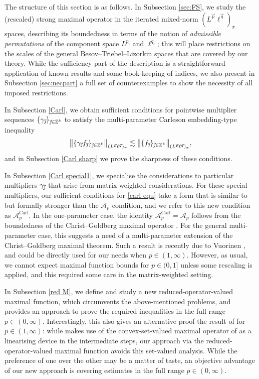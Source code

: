 \documentclass[11pt, reqno]{amsart}
\theoremstyle{definition}
\theoremstyle{remark}
\numberwithin{equation}{section}
\newcommand{\A}{\mathscr A}
\newcommand{\Z}{\mathbb Z}
\newcommand{\vj}{\vec{\textit{\j}}}
\newcommand{\vp}{\vec p}
\newcommand{\vq}{\vec q}
\newcommand{\bNorm}[2]{\big\|#1\big\|_{#2}}
\newcommand{\Carl}{\mathrm{Carl}}
\begin{document}
The structure of this section is as follows.
In Subsection \ref{sec:FS}, we study the (rescaled) strong maximal operator in the iterated mixed-norm $(L^{\vp}\ell^{\vq})_\pi$ spaces, describing its boundedness in terms of the notion of {\em admissible permutations} of the component space $L^{p_i}$ and $\ell^{q_i}$; this will place restrictions on the scales of the general Besov--Triebel--Lizorkin spaces that are covered by our theory. While the sufficiency part of the description is a straightforward application of known results and some book-keeping of indices, we also present in Subsection \ref{sec:necpart} a full set of counterexamples to show the necessity of all imposed restrictions.

In Subsection \ref{Carl}, we obtain sufficient conditions for pointwise multiplier sequences $\{\gamma_{\vj}\}_{\vj\in\Z^k}$ to satisfy the multi-parameter Carleson embedding-type inequality
\begin{equation} \label{carl equ}
\bNorm{\{\gamma_{\vj}f_{\vj}\}_{\vj\in\mathbb Z^k}}{(L^{\vp}\ell^{\vq})_\pi}
\lesssim \bNorm{\{ f_{\vj}\}_{\vj\in\mathbb Z^k}}{(L^{\vp}\ell^{\vq})_\pi},
\end{equation}
and in Subsection \ref{Carl sharp} we prove the sharpness of these conditions.

In Subsection \ref{Carl special1}, we specialise the considerations to particular multipliers $\gamma_{\vj}$ that arise from matrix-weighted considerations. For these special multipliers, our sufficient conditions for \eqref{carl equ} take a form that is similar to but formally stronger than the $\A_p$ condition, and we refer to this new condition as $\A_p^{\Carl}$. In the one-parameter case, the identity $\A_p^{\Carl}=\A_p$ follows from the boundedness of the Christ--Goldberg maximal operator \cite{CG01,Gold03}. For the general multi-parameter case, this suggests a need of a multi-parameter extension of the Christ--Goldberg maximal theorem. Such a result is recently due to Vuorinen \cite{Vuo24}, and could be directly used for our needs when $p\in(1,\infty)$. However, as usual, we cannot expect maximal function bounds for $p\in(0,1]$ unless some rescaling is applied, and this required some care in the matrix-weighted setting.

In Subsection \ref{red M}, we define and study a new reduced-operator-valued maximal function, which circumvents the above-mentioned problems, and provides an approach to prove the required inequalities in the full range $p\in(0,\infty)$. Interestingly, this also gives an alternative proof the result of \cite{Vuo24} for $p\in(1,\infty)$: while \cite{Vuo24} makes use of the convex-set-valued maximal operator of \cite{BCU} as a linearising device in the intermediate steps, our approach via the reduced-operator-valued maximal function avoids this set-valued analysis. While the preference of one over the other may be a matter of taste, an objective advantage of our new approach is covering estimates in the full range $p\in(0,\infty)$.
\end{document}
